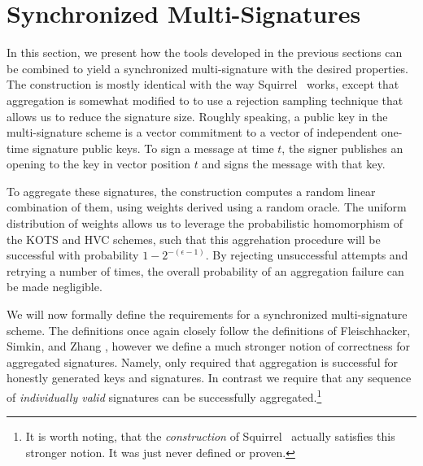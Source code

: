 
\section{Synchronized Multi-Signatures}\label{sec:nidv}

In this section, we present how the tools developed in the previous sections can be combined to yield a synchronized multi-signature with the desired properties.
The construction is mostly identical with the way Squirrel~\cite{CCS:FleSimZha22} works, except that aggregation is somewhat modified to to use a rejection sampling technique that allows us to reduce the signature size.
Roughly speaking, a public key in the multi-signature scheme is a vector commitment to a vector of independent one-time signature public keys.
To sign a message at time $t$, the signer publishes an opening to the key in vector position $t$ and signs the message with that key.

To aggregate these signatures, the construction computes a random linear combination of them, using weights derived using a random oracle.
The uniform distribution of weights allows us to leverage the probabilistic homomorphism of the KOTS and HVC schemes, such that this aggrehation procedure will be successful with probability $1-2^{-(\epsilon-1)}$.
By rejecting unsuccessful attempts and retrying a number of times, the overall probability of an aggregation failure can be made negligible.

We will now formally define the requirements for a synchronized multi-signature scheme.
The definitions once again closely follow the definitions of Fleischhacker, Simkin, and Zhang \cite{CCS:FleSimZha22}, however we define a much stronger notion of correctness for aggregated signatures.
Namely, \cite{CCS:FleSimZha22} only required that aggregation is successful for honestly generated keys and signatures.
In contrast we require that any sequence of \emph{individually valid} signatures can be successfully aggregated.\footnote{It is worth noting, that the  \emph{construction} of Squirrel~\cite{CCS:FleSimZha22} actually satisfies this stronger notion. It was just never defined or proven.}

